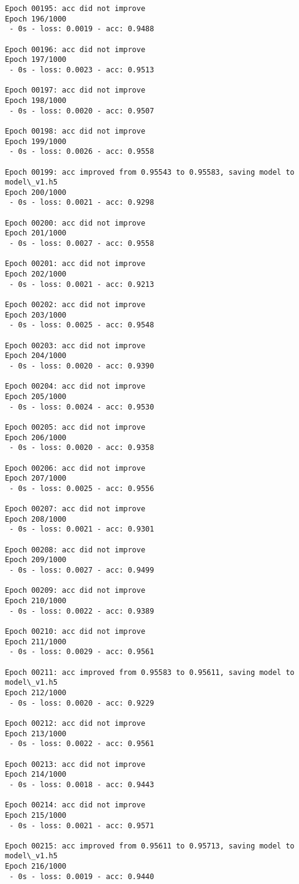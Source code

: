 \documentclass[11pt]{article}
\begin{document}
\begin{Verbatim}[commandchars=\\\{\}]
Epoch 00195: acc did not improve
Epoch 196/1000
 - 0s - loss: 0.0019 - acc: 0.9488

Epoch 00196: acc did not improve
Epoch 197/1000
 - 0s - loss: 0.0023 - acc: 0.9513

Epoch 00197: acc did not improve
Epoch 198/1000
 - 0s - loss: 0.0020 - acc: 0.9507

Epoch 00198: acc did not improve
Epoch 199/1000
 - 0s - loss: 0.0026 - acc: 0.9558

Epoch 00199: acc improved from 0.95543 to 0.95583, saving model to model\_v1.h5
Epoch 200/1000
 - 0s - loss: 0.0021 - acc: 0.9298

Epoch 00200: acc did not improve
Epoch 201/1000
 - 0s - loss: 0.0027 - acc: 0.9558

Epoch 00201: acc did not improve
Epoch 202/1000
 - 0s - loss: 0.0021 - acc: 0.9213

Epoch 00202: acc did not improve
Epoch 203/1000
 - 0s - loss: 0.0025 - acc: 0.9548

Epoch 00203: acc did not improve
Epoch 204/1000
 - 0s - loss: 0.0020 - acc: 0.9390

Epoch 00204: acc did not improve
Epoch 205/1000
 - 0s - loss: 0.0024 - acc: 0.9530

Epoch 00205: acc did not improve
Epoch 206/1000
 - 0s - loss: 0.0020 - acc: 0.9358

Epoch 00206: acc did not improve
Epoch 207/1000
 - 0s - loss: 0.0025 - acc: 0.9556

Epoch 00207: acc did not improve
Epoch 208/1000
 - 0s - loss: 0.0021 - acc: 0.9301

Epoch 00208: acc did not improve
Epoch 209/1000
 - 0s - loss: 0.0027 - acc: 0.9499

Epoch 00209: acc did not improve
Epoch 210/1000
 - 0s - loss: 0.0022 - acc: 0.9389

Epoch 00210: acc did not improve
Epoch 211/1000
 - 0s - loss: 0.0029 - acc: 0.9561

Epoch 00211: acc improved from 0.95583 to 0.95611, saving model to model\_v1.h5
Epoch 212/1000
 - 0s - loss: 0.0020 - acc: 0.9229

Epoch 00212: acc did not improve
Epoch 213/1000
 - 0s - loss: 0.0022 - acc: 0.9561

Epoch 00213: acc did not improve
Epoch 214/1000
 - 0s - loss: 0.0018 - acc: 0.9443

Epoch 00214: acc did not improve
Epoch 215/1000
 - 0s - loss: 0.0021 - acc: 0.9571

Epoch 00215: acc improved from 0.95611 to 0.95713, saving model to model\_v1.h5
Epoch 216/1000
 - 0s - loss: 0.0019 - acc: 0.9440


\end{Verbatim}
\end{document}
